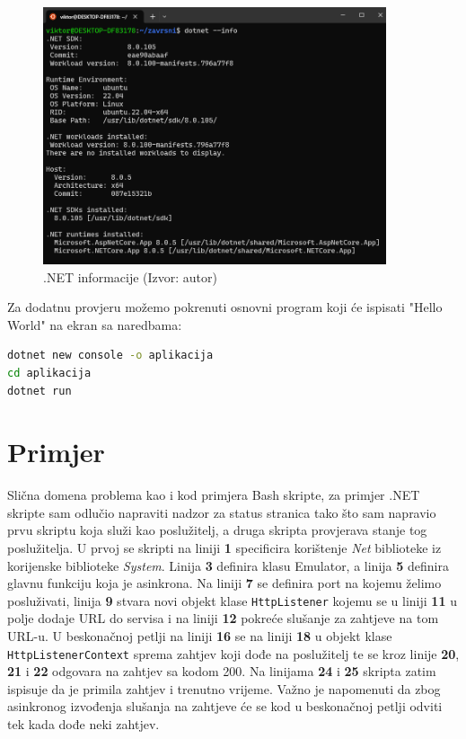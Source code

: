 \documentclass{foi}
\begin{document}
\begin{figure}[H]
    \centering
    \includegraphics[width=0.9\textwidth]{slike/info.png}
    \caption{.NET informacije (Izvor: autor)}
    \label{fig:info}
\end{figure}
\vspace{12pt}
Za dodatnu provjeru možemo pokrenuti osnovni program koji će ispisati "Hello World" na ekran sa naredbama\cite{nettest}:

\begin{lstlisting}[language=bash]
dotnet new console -o aplikacija
cd aplikacija
dotnet run
\end{lstlisting}

\section{Primjer}
Slična domena problema kao i kod primjera Bash skripte, za primjer .NET skripte sam odlučio napraviti nadzor za status stranica tako što sam napravio prvu skriptu koja služi kao poslužitelj, a druga skripta provjerava stanje tog poslužitelja. U prvoj se skripti na liniji \textbf{1} specificira korištenje \textit{Net} biblioteke iz korijenske biblioteke \textit{System}. Linija \textbf{3} definira klasu Emulator, a linija \textbf{5} definira glavnu funkciju koja je asinkrona. Na liniji \textbf{7} se definira port na kojemu želimo posluživati, linija \textbf{9} stvara novi objekt klase \verb|HttpListener| kojemu se u liniji \textbf{11} u polje dodaje URL do servisa i na liniji \textbf{12} pokreće slušanje za zahtjeve na tom URL-u. U beskonačnoj petlji na liniji \textbf{16} se na liniji \textbf{18} u objekt klase \verb|HttpListenerContext| sprema zahtjev koji dođe na poslužitelj te se kroz linije \textbf{20}, \textbf{21} i \textbf{22} odgovara na zahtjev sa kodom 200. Na linijama \textbf{24} i \textbf{25} skripta zatim ispisuje da je primila zahtjev i trenutno vrijeme. Važno je napomenuti da zbog asinkronog izvođenja slušanja na zahtjeve će se kod u beskonačnoj petlji odviti tek kada dođe neki zahtjev.
\end{document}
